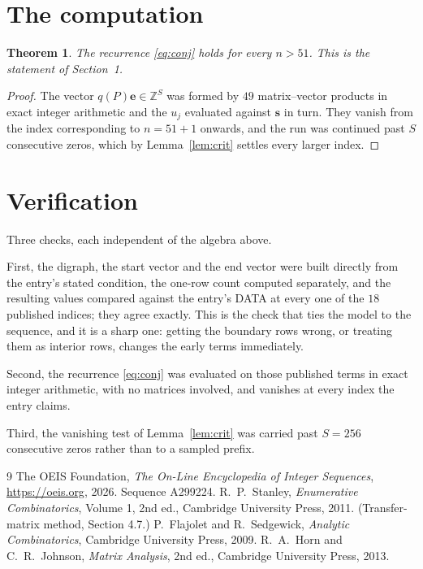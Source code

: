 \documentclass[11pt,a4paper]{article}
\theoremstyle{plain}
\newtheorem{theorem}{Theorem}
\theoremstyle{definition}
\begin{document}
\section{The computation}

\begin{theorem}
The recurrence \eqref{eq:conj} holds for every $n>51$. This is the statement of
Section~1.
\end{theorem}

\begin{proof}
The vector $q(P)\mathbf{e}\in\mathbb{Z}^{S}$ was formed by $49$ matrix--vector
products in exact integer arithmetic and the $u_j$ evaluated against $\mathbf{s}$ in turn.
They vanish from the index corresponding to $n=51+1$ onwards, and the run was continued
past $S$ consecutive zeros, which by Lemma~\ref{lem:crit} settles every larger index.
\end{proof}

\section{Verification}

Three checks, each independent of the algebra above.

First, the digraph, the start vector and the end vector were built directly from the
entry's stated condition, the one-row count computed separately, and the resulting values
compared against the entry's DATA at every one of the $18$ published indices; they
agree exactly. This is the check that ties the model to the sequence, and it is a sharp one:
getting the boundary rows wrong, or treating them as interior rows, changes the early terms
immediately.

Second, the recurrence \eqref{eq:conj} was evaluated on those published terms in exact
integer arithmetic, with no matrices involved, and vanishes at every index the entry claims.

Third, the vanishing test of Lemma~\ref{lem:crit} was carried past $S=256$ consecutive
zeros rather than to a sampled prefix.

\begin{thebibliography}{9}
 The OEIS Foundation, \emph{The On-Line Encyclopedia of Integer
Sequences}, \url{https://oeis.org}, 2026. Sequence A299224.
 R.~P.~Stanley, \emph{Enumerative Combinatorics}, Volume 1, 2nd ed.,
Cambridge University Press, 2011. (Transfer-matrix method, Section 4.7.)
 P.~Flajolet and R.~Sedgewick, \emph{Analytic Combinatorics}, Cambridge
University Press, 2009.
 R.~A.~Horn and C.~R.~Johnson, \emph{Matrix Analysis}, 2nd ed., Cambridge
University Press, 2013.
\end{thebibliography}
\end{document}
